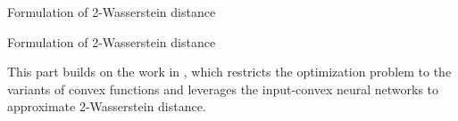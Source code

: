 \documentclass{beamer}		%
\begin{document}
\begin{frame}[noframenumbering]

    \begin{itemize}
    
        \begin{LARGE}
        
        \item {}
        
        \item Formulation of 2-Wasserstein distance
        
        \item {}
        
        \item {}
    
        \end{LARGE}
        
    \end{itemize}
        
    \end{frame}







\begin{frame}{Formulation of 2-Wasserstein distance}

This part builds on the work in , which restricts the optimization problem to the variants of convex functions and leverages the input-convex neural networks to approximate 2-Wasserstein distance.

    
\end{frame}
\end{document}
